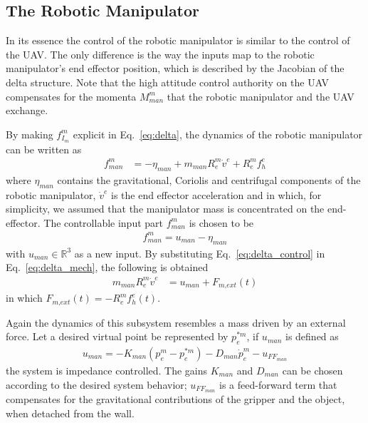 \documentclass[a4paper, 10pt, conference]{ieeeconf}
\renewcommand{\cdot}{}  %
\begin{document}
\subsection{The Robotic Manipulator}
In its essence the control of the robotic manipulator is similar to
the control of the UAV. The only difference is the way the inputs map
to the robotic manipulator's end effector position, which is described
by the Jacobian of the delta structure. Note that the high attitude control authority on the UAV compensates for the momenta $M_\textit{man}^m$ that the robotic manipulator and the UAV exchange.

By making $f_{I_m}^m$ explicit in Eq.~\ref{eq:delta}, %
the dynamics of the robotic manipulator can be written as
\begin{align}
  f_\textit{man}^m &= -\eta_\textit{man} + m_\textit{man} \cdot R_e^m \cdot \dot{v}^e + R_e^m
  \cdot f_h^e
\label{eq:delta_mech}
\end{align}
where $\eta_\textit{man}$ contains the gravitational, Coriolis and centrifugal components of the robotic manipulator, $\dot{v}^e$ is the
end effector acceleration and in which, for simplicity, we assumed that the manipulator mass is concentrated on the end-effector. %
%
The controllable input part $f_\textit{man}^m$ is chosen to be
\begin{align}
f_\textit{man}^m = u_\textit{man} - \eta_\textit{man}
\label{eq:delta_control}
\end{align}
with $u_\textit{man} \in \mathbb{R}^3$ as a new input. By
substituting Eq.~\ref{eq:delta_control} in Eq.~\ref{eq:delta_mech}, the following is
obtained
\begin{align}
m_\textit{man} \cdot R_e^m \dot{v}^e &= u_\textit{man} + F_\textit{m,ext}(t)
\end{align}
in which $F_\textit{m,ext}(t) = -R_e^m f_h^e(t)$.

Again the dynamics of this subsystem resembles a mass driven by an
external force. %
Let a desired virtual point be represented by $p_e^{* m}$, if $u_\textit{man}$ is defined as
\begin{align}
u_\textit{man} = -K_\textit{man} (p_e^m-p_e^{* m}) - D_\textit{man} \cdot \dot{p}_e^m - u_{{FF}_{\textit{man}}}
\end{align}
the system is impedance controlled. The gains $K_\textit{man}$ and $D_\textit{man}$ can be
chosen according to the desired system behavior; $u_{{FF}_{\textit{man}}}$ is a feed-forward term that compensates for the gravitational contributions of the gripper and the object, when detached from the wall.
\end{document}
